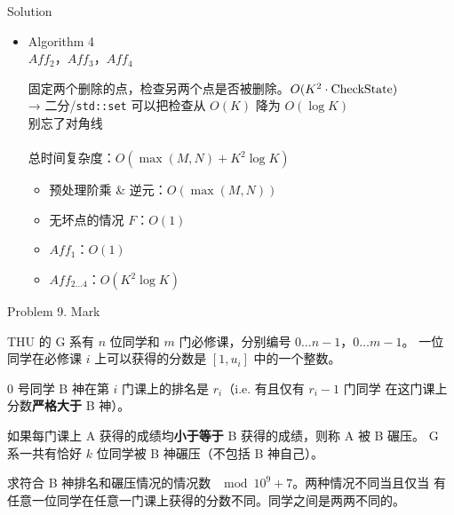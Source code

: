 \documentclass[UTF8]{beamer}
\begin{document}
\begin{frame}{Solution}

\begin{itemize}
    \item Algorithm 4 \\
        $Aff_2$，$Aff_3$，$Aff_4$

        \pause 固定两个删除的点，检查另两个点是否被删除。$O(K^2 \cdot {\rm CheckState})$ \\
        \pause → 二分/\texttt{std::set} 可以把检查从 $O(K)$ 降为 $O(\log K)$ \\
        \pause 别忘了对角线 \\
        　\\
        \pause 总时间复杂度：$O(\max(M, N) + K^2 \log K)$
        \begin{itemize}
            \item 预处理阶乘 \& 逆元：$O(\max(M, N))$
            \item 无坏点的情况 $F$：$O(1)$
            \item $Aff_1$：$O(1)$
            \item $Aff_{2 \dots 4}$：$O(K^2 \log K)$
        \end{itemize}
\end{itemize}

\end{frame}


\begin{frame}{Problem 9. Mark}

THU 的 G 系有 $n$ 位同学和 $m$ 门必修课，分别编号 $0 \dots n - 1$，$0 \dots m - 1$。
一位同学在必修课 $i$ 上可以获得的分数是 $[1, u_i]$ 中的一个整数。

0 号同学 B 神在第 $i$ 门课上的排名是 $r_i$（i.e. 有且仅有 $r_i - 1$ 门同学
在这门课上分数\textbf{严格大于} B 神）。

如果每门课上 A 获得的成绩均\textbf{小于等于} B 获得的成绩，则称 A 被 B 碾压。
G 系一共有恰好 $k$ 位同学被 B 神碾压（不包括 B 神自己）。

求符合 B 神排名和碾压情况的情况数 $\mod 10^9 + 7$。两种情况不同当且仅当
有任意一位同学在任意一门课上获得的分数不同。同学之间是两两不同的。

\end{frame}
\end{document}
